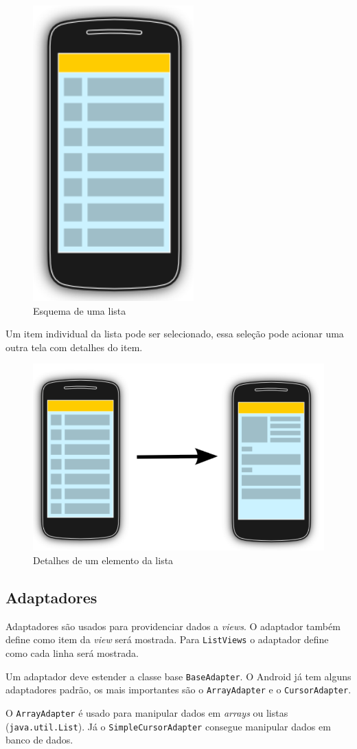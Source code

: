 \documentclass[a4paper,12pt,brazil,oneside]{book}
\begin{document}
\begin{singlespace}
\begin{figure}[H]
  \centering
  \includegraphics[width=.25\textwidth]{figuras/design/listview-scheme.png}
  \caption{Esquema de uma lista}
  \label{fig:e8}
\end{figure}

Um item individual da lista pode ser selecionado, essa seleção pode acionar uma outra tela com detalhes do item.


\begin{figure}[H]
  \centering
  \includegraphics[width=.45\textwidth]{figuras/design/listview-scheme2.png}
  \caption{Detalhes de um elemento da lista}
  \label{fig:e9}
\end{figure}

\subsection{Adaptadores}
	Adaptadores são usados para providenciar dados a \emph{views}. O adaptador também define como item da \emph{view} será mostrada. Para \texttt{ListViews} o adaptador define como cada linha será mostrada.
	
	Um adaptador deve estender a classe base \texttt{BaseAdapter}. O Android já tem alguns adaptadores padrão, os mais importantes são o \texttt{ArrayAdapter} e o \texttt{CursorAdapter}. 
	
	O \texttt{ArrayAdapter} é usado para manipular dados em \emph{arrays} ou listas (\texttt{java.util.List}). Já o \texttt{SimpleCursorAdapter} consegue manipular dados em banco de dados.


\end{singlespace}
\end{document}
